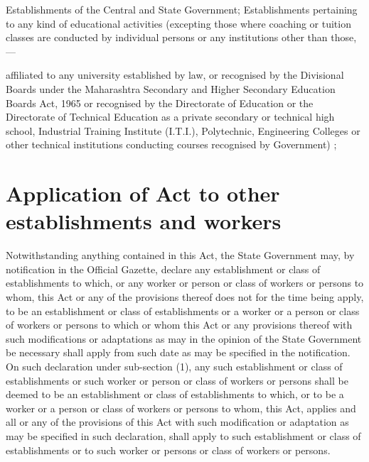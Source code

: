 \documentclass[gaz8,ordinance]{mhact}
\begin{document}
      \begin{subsectionlist}
    
     Establishments of the Central and State Government;
     Establishments pertaining to any kind of educational activities 
(excepting those where coaching or tuition classes are conducted by 
individual persons or any institutions other than those,---
      \begin{clause}
    
     affiliated to any university established by law, or
     recognised by the Divisional Boards under the Maharashtra 
Secondary and Higher Secondary Education Boards Act, 1965 
   or
     recognised by the Directorate of Education or the 
Directorate of Technical Education as a private secondary or 
technical high school, Industrial Training Institute (I.T.I.), 
Polytechnic, Engineering Colleges or other technical institutions 
conducting courses recognised by Government) ;
       \end{clause}
    
       \end{subsectionlist}
    
        \section{Application of Act to other establishments and workers} 
        
      \begin{subsectionlist}
    
     Notwithstanding anything contained in this Act, the State 
Government may, by notification in the Official Gazette, declare any 
establishment or class of establishments to which, or any worker or person 
or class of workers or persons to whom, this Act or any of the provisions 
thereof does not for the time being apply, to be an establishment or class of 
establishments or a worker or a person or class of workers or persons to 
which or whom this Act or any provisions thereof with such modifications or 
adaptations as may in the opinion of the State Government be necessary 
shall apply from such date as may be specified in the notification.
     On such declaration under sub-section (1), any such establishment 
or class of establishments or such worker or person or class of workers or persons shall be deemed to be an establishment or class of establishments to 
which, or to be a worker or a person or class of workers or persons to whom, 
this Act, applies and all or any of the provisions of this Act with such 
modification or adaptation as may be specified in such declaration, shall apply 
to such establishment or class of establishments or to such worker or persons 
or class of workers or persons.

       \end{subsectionlist}
    
\end{document}
